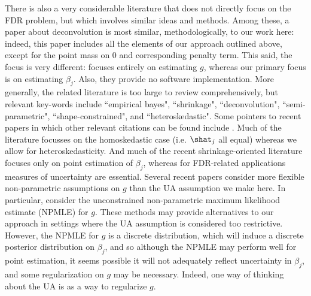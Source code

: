 There is also a very considerable literature that does not directly focus on the FDR problem, but which involves similar ideas and methods. 
 Among these, a paper about deconvolution \cite{cordy1997deconvolution} is most similar, methodologically, to our work here:
indeed, this paper includes all the elements of our approach outlined above, except for the point mass on 0 and corresponding penalty term.
This said, the focus is very different: \cite{cordy1997deconvolution} focuses entirely on estimating $g$, whereas our primary focus is on estimating $\beta_j$.
Also, they provide no software implementation.  More generally, the related literature is too large to review comprehensively, but relevant key-words include ``empirical bayes", ``shrinkage", ``deconvolution", ``semi-parametric", ``shape-constrained", and ``heteroskedastic". Some pointers to recent papers in which other relevant
citations can be found include \cite{xie2012sure, sarkar:2014, koenker2014convex}. Much of the literature focusses on the homoskedastic case (i.e. $\shat_j$ all equal) whereas we allow for heteroskedasticity. And much of the recent shrinkage-oriented literature focuses only on point estimation of $\beta_j$, whereas for FDR-related applications measures of uncertainty are essential. Several recent papers consider more flexible non-parametric assumptions on 
$g$ than the UA assumption we make here. In particular, \cite{jiang2009general,koenker2014convex} consider the unconstrained non-parametric maximum likelihood
estimate (NPMLE) for $g$. These methods may provide alternatives to our approach in settings where the UA assumption is considered too restrictive. However, the  NPMLE for $g$ is a discrete distribution, which will induce a discrete posterior distribution on $\beta_j$, and so although the NPMLE
may perform well for point estimation, it seems possible it will not adequately reflect uncertainty in $\beta_j$, and some regularization on $g$ may be necessary.
Indeed, one way of thinking about the UA is as a way to regularize $g$.